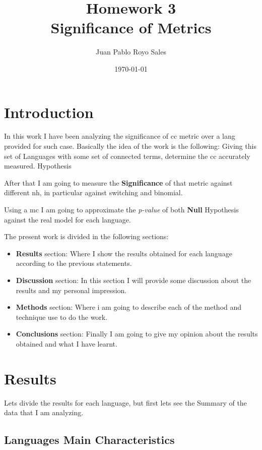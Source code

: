 \documentclass[12pt, a4paper]{article}
\title{%
      Homework 3\\
      Significance of Metrics\\
}
\author{Juan Pablo Royo Sales}
\affil{Universitat Politècnica de Catalunya}
\date\today
\begin{document}
\maketitle

\tableofcontents

\section{Introduction}
In this work I have been analyzing the significance of \acrfull{cc} metric over a \acrfull{lang} provided for such case.
Basically the idea of the work is the following: Giving this set of Languages with some set of connected terms, determine 
the \acrshort{cc} accurately measured. Hypothesis

After that I am going to measure the \textbf{Significance} of that metric against different \acrshort{nh}, in particular against \acrfull{switching} and \acrfull{binomial}.

Using a \acrfull{mc} I am going to approximate the \textit{p-value} of both \textbf{Null} Hypothesis against the real model for each language.

The present work is divided in the following sections:

\begin{itemize}
    \item \textbf{Results} section: Where I show the results obtained for each language according to the previous statements.
    \item \textbf{Discussion} section: In this section I will provide some discussion about the results and my personal impression.
    \item \textbf{Methods} section: Where i am going to describe each of the method and technique use to do the work.
    \item \textbf{Conclusions} section: Finally I am going to give my opinion about the results obtained and what I have learnt.
\end{itemize}

\section{Results}
Lets divide the results for each language, but first lets see the Summary of the data that I am analyzing.

\subsection{Languages Main Characteristics}
\end{document}
